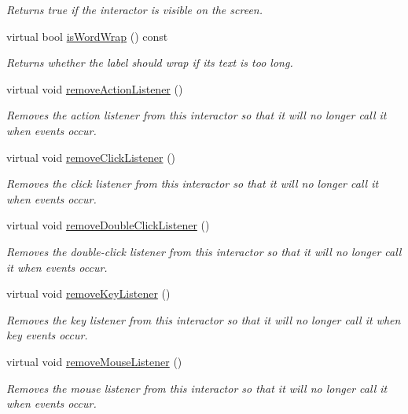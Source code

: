 \begin{DoxyCompactItemize}
\begin{DoxyCompactList}\small\item\em Returns true if the interactor is visible on the screen. \end{DoxyCompactList}\item 
virtual bool \mbox{\hyperlink{classsgl_1_1GLabel_a52b12a2d7b5e2fec7478e3715c98c315}{is\+Word\+Wrap}} () const
\begin{DoxyCompactList}\small\item\em Returns whether the label should wrap if its text is too long. \end{DoxyCompactList}\item 
virtual void \mbox{\hyperlink{classsgl_1_1GInteractor_ab7fe7a876367b87cf7202f947f1d05e4}{remove\+Action\+Listener}} ()
\begin{DoxyCompactList}\small\item\em Removes the action listener from this interactor so that it will no longer call it when events occur. \end{DoxyCompactList}\item 
virtual void \mbox{\hyperlink{classsgl_1_1GInteractor_ad39d0325cde6b97ebda4b9d7787c633b}{remove\+Click\+Listener}} ()
\begin{DoxyCompactList}\small\item\em Removes the click listener from this interactor so that it will no longer call it when events occur. \end{DoxyCompactList}\item 
virtual void \mbox{\hyperlink{classsgl_1_1GInteractor_aa4250907e4cdd77349c04f0cf5cdd3d3}{remove\+Double\+Click\+Listener}} ()
\begin{DoxyCompactList}\small\item\em Removes the double-\/click listener from this interactor so that it will no longer call it when events occur. \end{DoxyCompactList}\item 
virtual void \mbox{\hyperlink{classsgl_1_1GInteractor_a43095f41cab3be732b49f29970484b05}{remove\+Key\+Listener}} ()
\begin{DoxyCompactList}\small\item\em Removes the key listener from this interactor so that it will no longer call it when key events occur. \end{DoxyCompactList}\item 
virtual void \mbox{\hyperlink{classsgl_1_1GInteractor_aff47f71ce47e688a07c9d38dc92fcc11}{remove\+Mouse\+Listener}} ()
\begin{DoxyCompactList}\small\item\em Removes the mouse listener from this interactor so that it will no longer call it when events occur. \end{DoxyCompactList}\item 

\end{DoxyCompactItemize}
